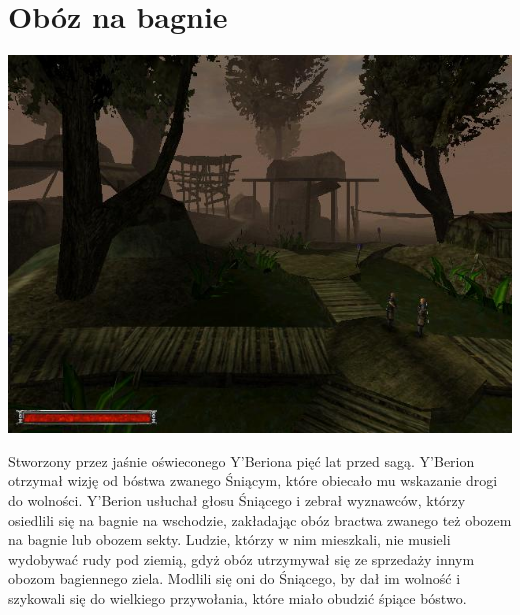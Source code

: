 \documentclass[11pt,polish, openany]{book}
\begin{document}
\section{Obóz na bagnie}
\begin{center}
 \includegraphics[scale=0.5]{nabagnie.jpg}
\end{center}
Stworzony przez jaśnie oświeconego Y'Beriona pięć lat przed sagą. Y'Berion otrzymał wizję od bóstwa zwanego Śniącym, które obiecało mu wskazanie drogi do wolności. Y'Berion usłuchał głosu Śniącego i zebrał wyznawców, którzy osiedlili się na bagnie na wschodzie, zakładając obóz bractwa zwanego też obozem na bagnie lub obozem sekty. Ludzie, którzy w nim mieszkali, nie musieli wydobywać rudy pod ziemią, gdyż obóz utrzymywał się ze sprzedaży innym obozom bagiennego ziela. Modlili się oni do Śniącego, by dał im wolność i szykowali się do wielkiego przywołania, które miało obudzić śpiące bóstwo.
\end{document}
